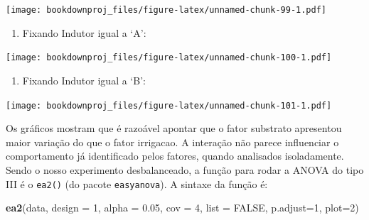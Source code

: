 \documentclass[
]{article}
\newenvironment{Shaded}{\begin{snugshade}}{\end{snugshade}}
\newcommand{\DataTypeTok}[1]{\textcolor[rgb]{0.13,0.29,0.53}{#1}}
\newcommand{\DecValTok}[1]{\textcolor[rgb]{0.00,0.00,0.81}{#1}}
\newcommand{\FloatTok}[1]{\textcolor[rgb]{0.00,0.00,0.81}{#1}}
\newcommand{\KeywordTok}[1]{\textcolor[rgb]{0.13,0.29,0.53}{\textbf{#1}}}
\newcommand{\NormalTok}[1]{#1}
\newcommand{\OperatorTok}[1]{\textcolor[rgb]{0.81,0.36,0.00}{\textbf{#1}}}
\newcommand{\OtherTok}[1]{\textcolor[rgb]{0.56,0.35,0.01}{#1}}
\newcommand{\StringTok}[1]{\textcolor[rgb]{0.31,0.60,0.02}{#1}}
\providecommand{\tightlist}{%
  \setlength{\itemsep}{0pt}\setlength{\parskip}{0pt}}
\begin{document}
\texttt{[image: bookdownproj\_files/figure-latex/unnamed-chunk-99-1.pdf]}

\begin{enumerate}
\def\labelenumi{\arabic{enumi}.}
\setcounter{enumi}{5}
\tightlist
\item
  Fixando Indutor igual a `A':
\end{enumerate}

\begin{Shaded}
\end{Shaded}

\texttt{[image: bookdownproj\_files/figure-latex/unnamed-chunk-100-1.pdf]}

\begin{enumerate}
\def\labelenumi{\arabic{enumi}.}
\setcounter{enumi}{6}
\tightlist
\item
  Fixando Indutor igual a `B':
\end{enumerate}

\begin{Shaded}
\end{Shaded}

\texttt{[image: bookdownproj\_files/figure-latex/unnamed-chunk-101-1.pdf]}

Os gráficos mostram que é razoável apontar que o fator substrato apresentou maior variação do que o fator irrigacao. A interação não parece influenciar o comportamento já identificado pelos fatores, quando analisados isoladamente. Sendo o nosso experimento desbalanceado, a função para rodar a ANOVA do tipo III é o \texttt{ea2()} (do pacote \texttt{easyanova}). A sintaxe da função é:

\begin{Shaded}
\begin{Highlighting}[]
\KeywordTok{ea2}\NormalTok{(data, }\DataTypeTok{design =} \DecValTok{1}\NormalTok{, }\DataTypeTok{alpha =} \FloatTok{0.05}\NormalTok{, }\DataTypeTok{cov =} \DecValTok{4}\NormalTok{, }\DataTypeTok{list =} \OtherTok{FALSE}\NormalTok{, }\DataTypeTok{p.adjust=}\DecValTok{1}\NormalTok{, }\DataTypeTok{plot=}\DecValTok{2}\NormalTok{)}
\end{Highlighting}
\end{Shaded}
\end{document}

